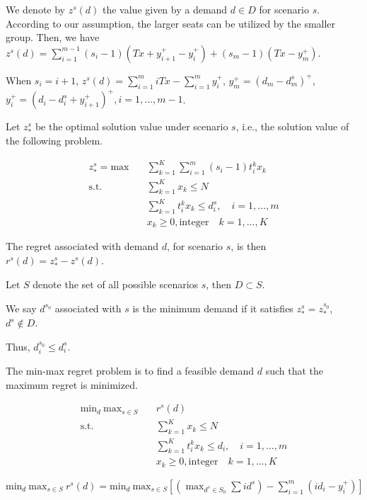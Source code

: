 We denote by $z^{s}(d)$ the value given by a demand $d \in D$ for scenario $s$. According to our assumption, the larger seats can be utilized by the smaller group. Then, we have
$z^{s}(d) = \sum_{i=1}^{m-1}(s_i -1)(Tx + y_{i+1}^{+}-y_{i}^{+}) + (s_m-1)(Tx- y_m^{+})$.

When $s_i = i+1$, $z^{s}(d) = \sum_{i=1}^{m} i Tx - \sum_{i=1}^{m} y_{i}^{+}$, $y_{m}^{+} = (d_{m} - d_{m}^{s})^{+}$, $y_{i}^{+} = (d_{i} - d_{i}^{s} + y_{i+1}^{+})^{+}, i = 1, \ldots, m-1$.

Let $z^{s}_{*}$ be the optimal solution value under scenario $s$, i.e., the solution value of the following problem.

\begin{align*}
  z^{s}_{*} = \mbox{max}\quad & \sum_{k=1}^K \sum_{i=1}^m (s_i-1) t_{i}^{k}x_{k} \\
  \mbox{s.t.} \quad & \sum_{k=1}^K x_{k} \leq N \\
  & \sum_{k=1}^K t_i^k x_k \leq d_i^{s},\quad i=1,\ldots,m \\
  & x_{k} \geq 0, \mbox{integer} \quad k = 1,\ldots,K
\end{align*}

The regret associated with demand $d$, for scenario $s$, is then $r^{s}(d) = z^{s}_{*} - z^{s}(d)$.

Let $S$ denote the set of all possible scenarios $s$, then $D \subset S$.

\begin{definition}
  We say $d^{s_0}$ associated with $s$ is the minimum demand if it satisfies $z^{s}_{*} = z^{s_0}_{*}$, $d^{s} \notin D$.
\end{definition}

Thus, $d^{s_0}_{i} \leq d^{s}_{i}$.

The min-max regret problem is to find a feasible demand $d$ such that the maximum regret is minimized.

\begin{align*}
  \mbox{min}_{d} \ \mbox{max}_{s \in S}\quad & r^{s}(d) \\
  \mbox{s.t.} \quad & \sum_{k=1}^K x_{k} \leq N \\
  & \sum_{k=1}^K t_i^k x_k \leq d_i,\quad i=1,\ldots,m \\
  & x_{k} \geq 0, \mbox{integer} \quad k = 1,\ldots,K
\end{align*}

$\mbox{min}_{d} \ \mbox{max}_{s \in S} \ r^{s}(d) = \mbox{min}_{d} \ \mbox{max}_{s \in S} [(\max_{d^{s} \in S_0} \sum i d^{s}) - \sum_{i=1}^{m} (i d_i - y_{i}^{+})]$

